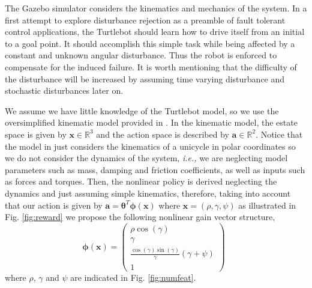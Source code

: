 \documentclass{aamas2016}
\renewcommand{\Re}{\mathbb{R}}
\begin{document}
The Gazebo simulator considers the kinematics and mechanics of the system. In a first attempt to explore disturbance rejection as a preamble of
fault tolerant control applications, the Turtlebot should learn how to drive itself from an initial to a goal point.
It should accomplish this simple task while being affected by a constant and unknown angular disturbance. Thus the robot is enforced to
compensate for the induced failure. It is worth mentioning that the difficulty of the disturbance will be increased by assuming
time varying disturbance and stochastic disturbances later on.

We assume we have little knowledge of the Turtlebot model, so we use the oversimplified kinematic model provided in \cite{aicardi1994closed}.
In the kinematic model, the estate space is given by $\boldsymbol{x} \in \Re^3$ and the action space is described by 
$\boldsymbol{a} \in \Re^2$. Notice that the model in \cite{aicardi1994closed} just considers the kinematics of a unicycle in polar coordinates
so we do not consider the dynamics of the system, \emph{i.e.,} we are neglecting model parameters such as mass, damping and friction 
coefficients, as well as inputs such as forces and torques. Then, the nonlinear policy is derived neglecting the dynamics and just assuming
simple kinematics, therefore, taking into account that our action is given by 
$\boldsymbol{a} = \boldsymbol{\theta}^{T}\boldsymbol{\phi}(\boldsymbol{x})$
where $\boldsymbol{x} = (\rho,\gamma,\psi)$ as illustrated in Fig. \ref{fig:reward} we propose the following nonlinear gain vector
structure,
\begin{equation} \label{eqn:state}
	\boldsymbol{\phi}(\boldsymbol{x}) = \left(\begin{array}{c} \rho \cos(\gamma) \\ \gamma \\ \frac{\cos(\gamma)\sin(\gamma)}{\gamma}\left(\gamma + \psi \right) \\ 1 \end{array}\right) \enspace
\end{equation}
where $\rho$, $\gamma$ and $\psi$ are indicated in Fig. \ref{fig:numfeat}.
\end{document}
